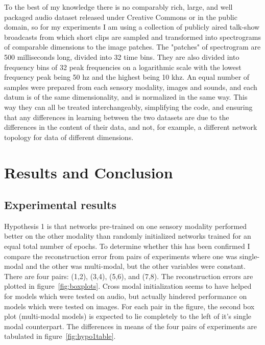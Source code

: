 \documentclass[12pt]{article}
\begin{document}
\begin{doublespacing}
	To the best of my knowledge there is no comparably rich, large, and well packaged audio dataset released under Creative Commons or in the public domain, so for my experiments I am using a collection of publicly aired talk-show broadcasts from which short clips are sampled and transformed into spectrograms of comparable dimensions to the image patches. The "patches" of spectrogram are 500 milliseconds long, divided into 32 time bins. They are also divided into frequency bins of 32 peak frequencies on a logarithmic scale with the lowest frequency peak being 50 hz and the highest being 10 khz. An equal number of samples were prepared from each sensory modality, images and sounds, and each datum is of the same dimensionality, and is normalized in the same way. This way they can all be treated interchangeably, simplifying the code, and ensuring that any differences in learning between the two datasets are due to the differences in the content of their data, and not, for example, a different network topology for data of different dimensions.
	
\section{Results and Conclusion}
	\subsection{Experimental results}
	Hypothesis 1 is that networks pre-trained on one sensory modality performed better on the other modality than randomly initialized networks trained for an equal total number of epochs. To determine whether this has been confirmed I compare the reconstruction error from pairs of experiments where one was single-modal and the other was multi-modal, but the other variables were constant. There are four pairs: (1,2), (3,4), (5,6), and (7,8). The reconstruction errors are plotted in figure~\ref{fig:boxplots}. Cross modal initialization seems to have helped for models which were tested on audio, but actually hindered performance on models which were tested on images. For each pair in the figure, the second box plot (multi-modal models) is expected to lie completely to the left of it's single modal counterpart. The differences in means of the four pairs of experiments are tabulated in figure~\ref{fig:hypo1table}. 
	

\end{doublespacing}
\end{document}
